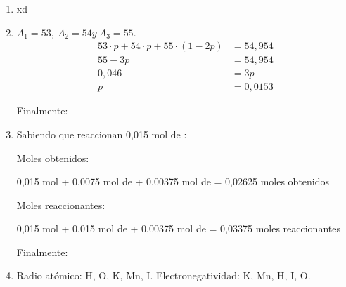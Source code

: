 \begin{enumerate}
\item xd

\item $A_1=53,\ A_2=54 y\ A_3=55.$
\begin{align*}
    53 \cdot p + 54 \cdot p + 55 \cdot (1 - 2p) &= 54,954\\    
    55 - 3p &= 54,954\\
    0,046 &= 3p\\
    p &= 0,0153
\end{align*}

Finalmente:

\hfil {}\hfil


\item Sabiendo que reaccionan 0,015 mol de :

Moles obtenidos:

\hfil
0,015 mol  + 0,0075 mol de  + 0,00375 mol de  = 0,02625 moles obtenidos
\hfil

Moles reaccionantes:

\hfil
0,015 mol  + 0,015 mol de  + 0,00375 mol de  = 0,03375 moles reaccionantes
\hfil


Finalmente:

\hfil {}\hfil


\item Radio atómico: H, O, K, Mn, I.
\hfil
Electronegatividad: K, Mn, H, I, O.
\hfil

\end{enumerate}

